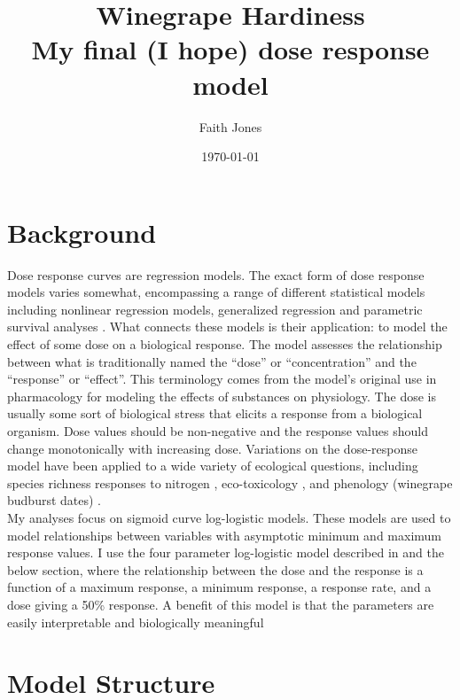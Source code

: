\documentclass[11pt,letter]{article}
\title{Winegrape Hardiness \\ My final (I hope) dose response model}
\date{\today}
\author{Faith Jones}
\begin{document}
\renewcommand{\bibname}{References}%


\maketitle{}
\tableofcontents

\section{Background}
Dose response curves are regression models. The exact form of dose response models varies somewhat, encompassing a range of different statistical models including nonlinear regression models, generalized regression and parametric survival analyses \cite{Ritz2015}. What connects these models is their application: to model the effect of some dose on a biological response. The model assesses the relationship between what is traditionally named the ``dose'' or ``concentration'' and the ``response'' or ``effect''. This terminology comes from the model's  original use in pharmacology for modeling the effects of substances on physiology. The dose is usually some sort of biological stress that elicits a response from a biological organism. Dose values should be non-negative \cite{Rudemo1989} and the response values should change monotonically with increasing dose. Variations on the dose-response model have been applied to a wide variety of ecological questions, including species richness responses to nitrogen \cite{Jones2018a}, eco-toxicology \cite{Haanstra1985}, and phenology (winegrape budburst dates) \cite{Kovaleski2019}. \\

My analyses focus on sigmoid curve log-logistic models. These models are used to model relationships between variables with asymptotic minimum and maximum response values. I use the four parameter log-logistic model described in \cite{Ritz2015} and the below section, where the relationship between the dose and the response is a function of a maximum response, a minimum response, a response rate, and a dose giving a 50\% response. A benefit of this model is that the parameters are easily interpretable and biologically meaningful \cite{Seefeldt2016}\\

\section{Model Structure}
\end{document}
